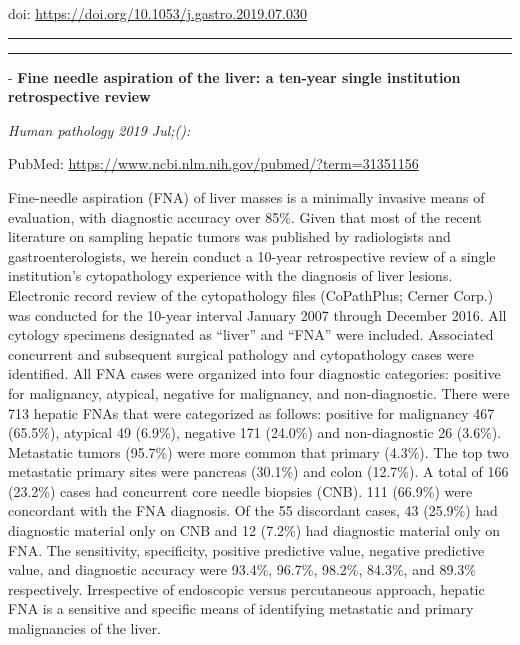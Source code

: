 \documentclass[]{article}
\begin{document}
doi: \url{https://doi.org/10.1053/j.gastro.2019.07.030}

{}

{}

\begin{center}\rule{0.5\linewidth}{\linethickness}\end{center}

\begin{center}\rule{0.5\linewidth}{\linethickness}\end{center}

 - \textbf{Fine needle aspiration of the liver: a ten-year single
institution retrospective review}

\emph{Human pathology 2019 Jul;():}

PubMed: \url{https://www.ncbi.nlm.nih.gov/pubmed/?term=31351156}

Fine-needle aspiration (FNA) of liver masses is a minimally invasive
means of evaluation, with diagnostic accuracy over 85\%. Given that most
of the recent literature on sampling hepatic tumors was published by
radiologists and gastroenterologists, we herein conduct a 10-year
retrospective review of a single institution's cytopathology experience
with the diagnosis of liver lesions. Electronic record review of the
cytopathology files (CoPathPlus; Cerner Corp.) was conducted for the
10-year interval January 2007 through December 2016. All cytology
specimens designated as ``liver'' and ``FNA'' were included. Associated
concurrent and subsequent surgical pathology and cytopathology cases
were identified. All FNA cases were organized into four diagnostic
categories: positive for malignancy, atypical, negative for malignancy,
and non-diagnostic. There were 713 hepatic FNAs that were categorized as
follows: positive for malignancy 467 (65.5\%), atypical 49 (6.9\%),
negative 171 (24.0\%) and non-diagnostic 26 (3.6\%). Metastatic tumors
(95.7\%) were more common that primary (4.3\%). The top two metastatic
primary sites were pancreas (30.1\%) and colon (12.7\%). A total of 166
(23.2\%) cases had concurrent core needle biopsies (CNB). 111 (66.9\%)
were concordant with the FNA diagnosis. Of the 55 discordant cases, 43
(25.9\%) had diagnostic material only on CNB and 12 (7.2\%) had
diagnostic material only on FNA. The sensitivity, specificity, positive
predictive value, negative predictive value, and diagnostic accuracy
were 93.4\%, 96.7\%, 98.2\%, 84.3\%, and 89.3\% respectively.
Irrespective of endoscopic versus percutaneous approach, hepatic FNA is
a sensitive and specific means of identifying metastatic and primary
malignancies of the liver.
\end{document}
